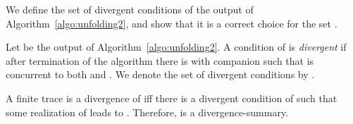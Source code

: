\documentclass{llncs}
\begin{document}
We define the set of divergent conditions of the output of Algorithm~\ref{algo:unfolding2}, and show that it is a correct choice for the set .

\begin{definition}
Let  be the output of Algorithm~\ref{algo:unfolding2}. A condition  of  is {\em divergent}
if after termination of the algorithm there is  with 
companion  such that  is concurrent to both  and . We denote
the set of divergent conditions by .
\end{definition}

\begin{theorem}
\label{thm:divergences}
A finite trace  is a divergence of  
if{}f there is a divergent condition  of  such that some realization
of  leads to . Therefore,  is a divergence-summary.
\end{theorem}
\end{document}
